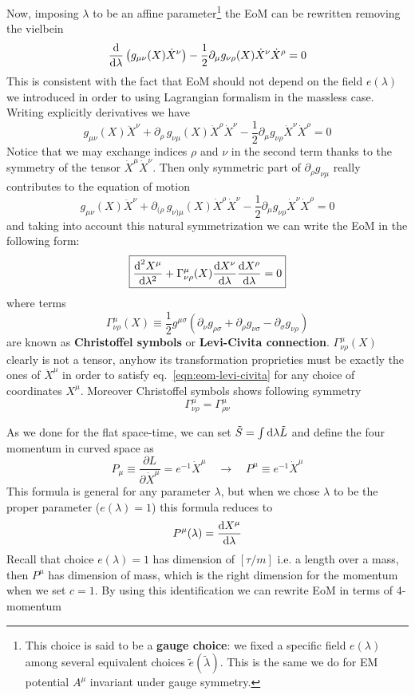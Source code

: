 \documentclass[../main/main.tex]{subfiles}
\begin{document}
Now, imposing $\lambda$ to be an affine parameter\footnote{This choice is said to be a \textbf{gauge choice}: we fixed a specific field $e(\lambda)$ among several equivalent choices $\tilde e(\tilde\lambda)$. This is the same we do for EM potential $A^\mu$ invariant under gauge symmetry.} the EoM can be rewritten removing the vielbein
\[
\frac{\textup{d}}{\textup{d}\lambda}\left(g_{\mu\nu}(X)\dot X^\nu\right)-\frac12\partial_\mu g_{\nu\rho}(X)\dot X^\nu\dot X^\rho=0
\]
This is consistent with the fact that EoM should not depend on the field $e(\lambda)$ we introduced in order to using Lagrangian formalism in the massless case. Writing explicitly derivatives we have
\[g_{\mu\nu}(X)\ddot X^\nu+\partial_\rho \,g_{\nu\mu}(X)\dot X^\rho\dot X^\nu-\frac12\partial_\mu g_{\nu\rho}\dot X^\nu\dot X^\rho=0\]
Notice that we may exchange indices $\rho$ and $\nu$ in the second term thanks to the symmetry of the tensor $\dot X^\mu\dot X^\nu$. Then only symmetric part of $\partial_\rho g_{\nu\mu}$ really contributes to the equation of motion
\[g_{\mu\nu}(X)\ddot X^\nu+\partial_{(\rho} \,g_{\nu)\mu}(X)\dot X^\rho\dot X^\nu-\frac12\partial_\mu g_{\nu\rho}\dot X^\nu\dot X^\rho=0\]
and taking into account this natural symmetrization we can write the EoM in the following form:
\begin{equation}\label{eqn:eom-levi-civita}
\boxed{
\frac{\textup{d}^2X^\mu}{\textup{d}\lambda^2}+\Gamma^\mu_{\nu\rho}(X)\frac{\textup{d} X^\nu}{\textup{d}\lambda}\frac{\textup{d} X^\rho}{\textup{d}\lambda}=0
}
\end{equation}
where terms
\begin{equation}\label{eqn:dfn-levi-civita-coeff}
\boxed{
\Gamma^\mu_{\nu\rho}(X)\equiv\frac12g^{\mu\sigma}(\partial_\nu g_{\rho\sigma}+\partial_\rho g_{\nu\sigma}-\partial_\sigma g_{\nu\rho})
}
\end{equation}
are known as \textbf{Christoffel symbols} or \textbf{Levi-Civita connection}.  $\Gamma^\mu_{\nu\rho}(X)$ clearly is not a tensor, anyhow its transformation proprieties must be exactly the ones of $\ddot X^\mu$ in order to satisfy eq.~\eqref{eqn:eom-levi-civita} for any choice of coordinates $X^\mu$. Moreover Christoffel symbols shows following symmetry
\[\Gamma^\mu_{\nu\rho}=\Gamma^\mu_{\rho\nu}\]

As we done for the flat space-time, we can set $\tilde S=\int\textup{d}\lambda\tilde L$ and define the four momentum in curved space as
\begin{equation}
P_\mu\equiv\frac{\partial L}{\partial \dot X^\mu}=e^{-1}\dot X^\mu\quad\rightarrow\quad P^\mu \equiv e^{-1}\dot X^\mu
\end{equation}
This formula is general for any parameter $\lambda$, but when we chose $\lambda$ to be the proper parameter ($e(\lambda)=1$) this formula reduces to 
\[P^\mu(\lambda)=\frac{\textup{d} X^\mu}{\textup{d}\lambda}\]
Recall that choice $e(\lambda)=1$ has dimension of $[\tau/m]$ i.e. a length over a mass, then $P^\mu$ has dimension of mass, which is the right dimension for the momentum when we set $c=1$.
By using this identification we can rewrite EoM in terms of 4-momentum
\end{document}
